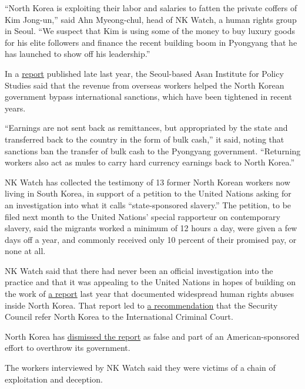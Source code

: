 ``North Korea is exploiting their labor and salaries to fatten the
private coffers of Kim Jong-un,'' said Ahn Myeong-chul, head of NK
Watch, a human rights group in Seoul. ``We suspect that Kim is using
some of the money to buy luxury goods for his elite followers and
finance the recent building boom in Pyongyang that he has launched to
show off his leadership.''

In a
\href{http://en.asaninst.org/contents/asan-report-beyond-the-coi-dprk-human-rights-report/}{report}
published late last year, the Seoul-based Asan Institute for Policy
Studies said that the revenue from overseas workers helped the North
Korean government bypass international sanctions, which have been
tightened in recent years.

``Earnings are not sent back as remittances, but appropriated by the
state and transferred back to the country in the form of bulk cash,'' it
said, noting that sanctions ban the transfer of bulk cash to the
Pyongyang government. ``Returning workers also act as mules to carry
hard currency earnings back to North Korea.''

NK Watch has collected the testimony of 13 former North Korean workers
now living in South Korea, in support of a petition to the United
Nations asking for an investigation into what it calls ``state-sponsored
slavery.'' The petition, to be filed next month to the United Nations'
special rapporteur on contemporary slavery, said the migrants worked a
minimum of 12 hours a day, were given a few days off a year, and
commonly received only 10 percent of their promised pay, or none at all.

NK Watch said that there had never been an official investigation into
the practice and that it was appealing to the United Nations in hopes of
building on the work of
\href{http://www.ohchr.org/EN/HRBodies/HRC/CoIDPRK/Pages/CommissionInquiryonHRinDPRK.aspx}{a
report} last year that documented widespread human rights abuses inside
North Korea. That report led to
\href{http://www.nytimes3xbfgragh.onion/2014/03/29/world/asia/un-north-korea.html}{a
recommendation} that the Security Council refer North Korea to the
International Criminal Court.

North Korea has
\href{http://www.nytimes3xbfgragh.onion/2014/09/14/world/asia/north-korea-says-reports-of-abuse-are-produced-by-political-racket.html}{dismissed
the report} as false and part of an American-sponsored effort to
overthrow its government.

The workers interviewed by NK Watch said they were victims of a chain of
exploitation and deception.

